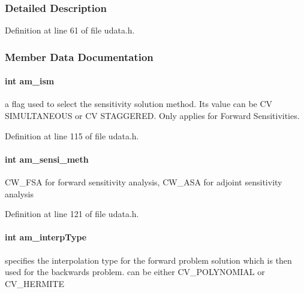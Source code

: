 \subsubsection{Detailed Description}


Definition at line 61 of file udata.\+h.



\subsubsection{Member Data Documentation}
\hypertarget{struct_user_data_a1f2514c0ee00da61ade386173b718a02}{}
\paragraph[{am\+\_\+ism}]{\setlength{\rightskip}{0pt plus 5cm}int am\+\_\+ism}\label{struct_user_data_a1f2514c0ee00da61ade386173b718a02}
a flag used to select the sensitivity solution method. Its value can be C\+V S\+I\+M\+U\+L\+T\+A\+N\+E\+O\+U\+S or C\+V S\+T\+A\+G\+G\+E\+R\+E\+D. Only applies for Forward Sensitivities. 

Definition at line 115 of file udata.\+h.

\hypertarget{struct_user_data_a83bc6716ecf3decb3d963929361fcd6d}{}
\paragraph[{am\+\_\+sensi\+\_\+meth}]{\setlength{\rightskip}{0pt plus 5cm}int am\+\_\+sensi\+\_\+meth}\label{struct_user_data_a83bc6716ecf3decb3d963929361fcd6d}
C\+W\+\_\+\+F\+S\+A for forward sensitivity analysis, C\+W\+\_\+\+A\+S\+A for adjoint sensitivity analysis 

Definition at line 121 of file udata.\+h.

\hypertarget{struct_user_data_a02adc800558b1cdac3fa8bc96e65dbbb}{}
\paragraph[{am\+\_\+interp\+Type}]{\setlength{\rightskip}{0pt plus 5cm}int am\+\_\+interp\+Type}\label{struct_user_data_a02adc800558b1cdac3fa8bc96e65dbbb}
specifies the interpolation type for the forward problem solution which is then used for the backwards problem. can be either C\+V\+\_\+\+P\+O\+L\+Y\+N\+O\+M\+I\+A\+L or C\+V\+\_\+\+H\+E\+R\+M\+I\+T\+E 

